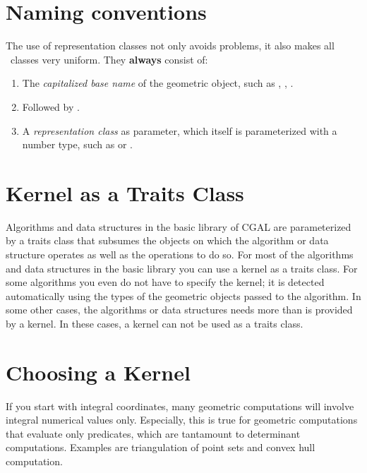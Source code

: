 \section{Naming conventions}

The use of representation classes not only avoids problems, it also
makes all \cgal\ classes very uniform. They {\bf always} consist of:
\begin{enumerate}
\begin{ccTexOnly}
\itemsep0pt\parskip0pt
\end{ccTexOnly}

\item The {\em capitalized base name} of the geometric object, such as
  , , .

\item Followed by .
  
\item A {\em representation class} as parameter, which itself is
  parameterized with a number type, such as
   or .
\end{enumerate}

\section{Kernel as a Traits Class}

Algorithms and data structures in the basic library of CGAL are
parameterized by a traits class that subsumes the objects on which the
algorithm or data structure operates as well as the operations to do
so. For most of the algorithms and data structures in the basic
library you can use a kernel as a traits class. For some algorithms
you even do not have to specify the kernel; it is detected
automatically using the types of the geometric objects passed to the
algorithm. In some other cases, the algorithms or data structures
needs more than is provided by a kernel. In these cases, a kernel can
not be used as a traits class.

\section{Choosing a Kernel}

If you start with integral  coordinates,
many geometric computations will involve integral numerical values
only. Especially, this is true for geometric computations that
evaluate only predicates, which are tantamount to determinant
computations. Examples are triangulation of point sets and convex hull
computation.  

